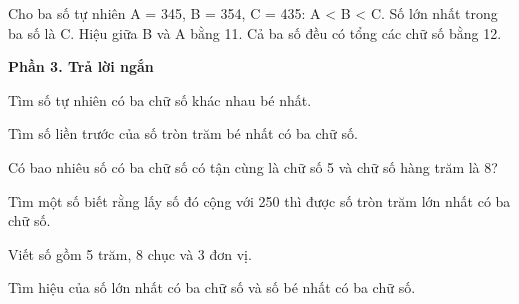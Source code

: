 \begin{ex} %
Cho ba số tự nhiên A = 345, B = 354, C = 435:
\choiceTF
{\True A < B < C.}
{\True Số lớn nhất trong ba số là C.}
{Hiệu giữa B và A bằng 11.}
{\True Cả ba số đều có tổng các chữ số bằng 12.}
\end{ex}

\textbf{Phần 3. Trả lời ngắn}

\begin{ex} %
Tìm số tự nhiên có ba chữ số khác nhau bé nhất.
\end{ex}

\begin{ex} %
Tìm số liền trước của số tròn trăm bé nhất có ba chữ số.
\end{ex}

\begin{ex} %
Có bao nhiêu số có ba chữ số có tận cùng là chữ số 5 và chữ số hàng trăm là 8?
\end{ex}

\begin{ex} %
Tìm một số biết rằng lấy số đó cộng với 250 thì được số tròn trăm lớn nhất có ba chữ số.
\end{ex}

\begin{ex} %
Viết số gồm 5 trăm, 8 chục và 3 đơn vị.
\end{ex}

\begin{ex} %
Tìm hiệu của số lớn nhất có ba chữ số và số bé nhất có ba chữ số.
\end{ex}
